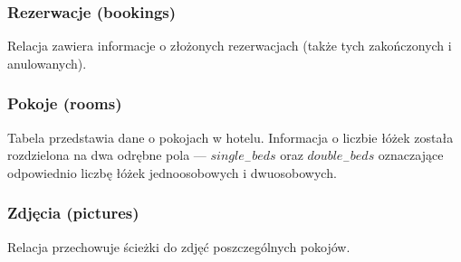 \documentclass [11pt, a4paper, leqno] {article}
\begin{document}
\subsubsection{Rezerwacje (bookings)}
\noindent
Relacja zawiera informacje o złożonych rezerwacjach (także tych zakończonych i anulowanych).

\subsubsection{Pokoje (rooms)}
\noindent
Tabela przedstawia dane o pokojach w hotelu. Informacja o liczbie łóżek została rozdzielona na dwa odrębne pola --- \textit{$single_{-}beds$} oraz \textit{$double_{-}beds$} oznaczające odpowiednio liczbę łóżek jednoosobowych i dwuosobowych.

\subsubsection{Zdjęcia (pictures)}
\noindent
Relacja przechowuje ścieżki do zdjęć poszczególnych pokojów.
\end{document}
